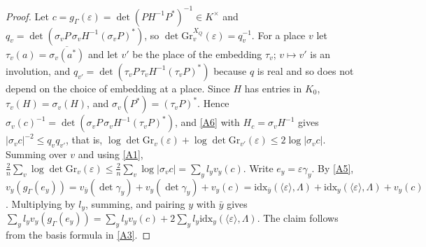 \documentclass[11pt]{amsart}
\theoremstyle{plain}
\theoremstyle{definition}
\numberwithin{equation}{section}
\begin{document}
\begin{proof}
Let $c=g_\Gamma(\varepsilon)=\det(PH^{-1}P^\ast)^{-1}\in K^\times$ and $q_v=\det(\sigma_vP\,\sigma_vH^{-1}(\sigma_vP)^\ast)$, so
$\det\mathrm{Gr}^{X_Q}_v(\varepsilon)=q_v^{-1}$. For a place $v$ let $\tau_v(a)=\overline{\sigma_v(a^\ast)}$ and let $v'$ be the place of the
embedding $\tau_v$; $v\mapsto v'$ is an involution, and $q_{v'}=\det(\tau_vP\,\tau_vH^{-1}(\tau_vP)^\ast)$ because
$q$ is real and so does not depend on the choice of embedding at a place. Since $H$ has entries in
$K_0$, $\tau_v(H)=\sigma_v(H)$, and $\sigma_v(P^\ast)=(\tau_vP)^\ast$. Hence
$\sigma_v(c)^{-1}=\det(\sigma_vP\,\sigma_vH^{-1}(\tau_vP)^\ast)$, and \ref{A6} with $H_c=\sigma_vH^{-1}$ gives
$|\sigma_vc|^{-2}\le q_vq_{v'}$, that
is, $\log\det\mathrm{Gr}_v(\varepsilon)+\log\det\mathrm{Gr}_{v'}(\varepsilon)\le2\log|\sigma_vc|$. Summing over $v$ and using
\ref{A1},
$\frac2n\sum_v\log\det\mathrm{Gr}_v(\varepsilon)\le\frac2n\sum_v\log|\sigma_vc|=\sum_yl_yv_y(c)$.
Write $e_y=\varepsilon\gamma_y$. By \ref{A5}, $v_y(g_\Gamma(e_y))=v_{\bar y}(\det\gamma_y)+v_y(\det\gamma_y)+v_y(c)
=\mathrm{idx}_{\bar y}(\langle\varepsilon\rangle,\Lambda)+\mathrm{idx}_y(\langle\varepsilon\rangle,\Lambda)+v_y(c)$. Multiplying by $l_y$,
summing, and pairing $y$ with $\bar y$ gives
$\sum_yl_yv_y(g_\Gamma(e_y))=\sum_yl_yv_y(c)+2\sum_yl_y\mathrm{idx}_y(\langle\varepsilon\rangle,\Lambda)$. The claim
follows from the basis formula in \ref{A3}.
\end{proof}
\end{document}
